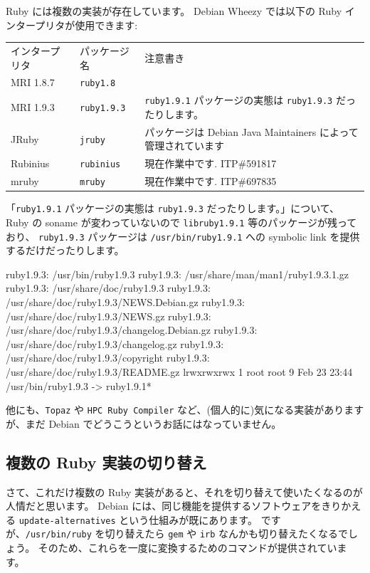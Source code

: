 \documentclass[mingoth,a4paper]{jsarticle}
\begin{document}
Ruby には複数の実装が存在しています。
Debian Wheezy では以下の Ruby インタープリタが使用できます:
\begin{table}[h!]
  \centering
  \begin{tabular}{lll}
    インタープリタ & パッケージ名       & 注意書き \\
    MRI 1.8.7      & \texttt{ruby1.8}   &          \\
    MRI 1.9.3      & \texttt{ruby1.9.3} & \texttt{ruby1.9.1} パッケージの実態は \texttt{ruby1.9.3} だったりします。 \\
    JRuby          & \texttt{jruby}     & パッケージは Debian Java Maintainers によって管理されています \\
    Rubinius       & \texttt{rubinius}  & 現在作業中です. ITP\#591817 \\
    mruby          & \texttt{mruby}     & 現在作業中です. ITP\#697835 \\
  \end{tabular}
\end{table}
%
\newline
「\texttt{ruby1.9.1} パッケージの実態は \texttt{ruby1.9.3} だったりします。」について、
Ruby の soname が変わっていないので \texttt{libruby1.9.1} 等のパッケージが残っており、
\texttt{ruby1.9.3} パッケージは \texttt{/usr/bin/ruby1.9.1} への
symbolic link を提供するだけだったりします。
\begin{commandline}
ruby1.9.3: /usr/bin/ruby1.9.3
ruby1.9.3: /usr/share/man/man1/ruby1.9.3.1.gz
ruby1.9.3: /usr/share/doc/ruby1.9.3
ruby1.9.3: /usr/share/doc/ruby1.9.3/NEWS.Debian.gz
ruby1.9.3: /usr/share/doc/ruby1.9.3/NEWS.gz
ruby1.9.3: /usr/share/doc/ruby1.9.3/changelog.Debian.gz
ruby1.9.3: /usr/share/doc/ruby1.9.3/changelog.gz
ruby1.9.3: /usr/share/doc/ruby1.9.3/copyright
ruby1.9.3: /usr/share/doc/ruby1.9.3/README.gz
lrwxrwxrwx 1 root root 9 Feb 23 23:44 /usr/bin/ruby1.9.3 -> ruby1.9.1*
\end{commandline}
他にも、\texttt{Topaz} や \texttt{HPC Ruby Compiler} など、(個人的に)気になる実装がありますが、まだ Debian でどうこうというお話にはなっていません。

\subsection{複数の Ruby 実装の切り替え}

さて、これだけ複数の Ruby 実装があると、それを切り替えて使いたくなるのが人情だと思います。
Debian には、同じ機能を提供するソフトウェアをきりかえる \texttt{update-alternatives} という仕組みが既にあります。
ですが、\texttt{/usr/bin/ruby} を切り替えたら \texttt{gem} や \texttt{irb} なんかも切り替えたくなるでしょう。
そのため、これらを一度に変換するためのコマンドが提供されています。
\end{document}
